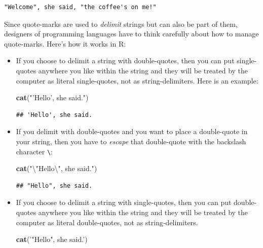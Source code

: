 \documentclass[]{book}
\makeatletter
\newenvironment{Shaded}{\begin{snugshade}}{\end{snugshade}}
\newcommand{\KeywordTok}[1]{\textcolor[rgb]{0.13,0.29,0.53}{\textbf{{#1}}}}
\newcommand{\CharTok}[1]{\textcolor[rgb]{0.31,0.60,0.02}{{#1}}}
\newcommand{\StringTok}[1]{\textcolor[rgb]{0.31,0.60,0.02}{{#1}}}
\newcommand{\NormalTok}[1]{{#1}}
\newenvironment{kframe}{%
\medskip{}
\setlength{\fboxsep}{.8em}
 \def\at@end@of@kframe{}%
 \ifinner\ifhmode%
  \def\at@end@of@kframe{\end{minipage}}%
  \begin{minipage}{\columnwidth}%
 \fi\fi%
 \def\FrameCommand##1{\hskip\@totalleftmargin \hskip-\fboxsep
 \colorbox{shadecolor}{##1}\hskip-\fboxsep
     \hskip-\linewidth \hskip-\@totalleftmargin \hskip\columnwidth}%
 \MakeFramed {\advance\hsize-\width
   \@totalleftmargin\z@ \linewidth\hsize
   \@setminipage}}%
 {\par\unskip\endMakeFramed%
 \at@end@of@kframe}
\renewenvironment{Shaded}{\begin{kframe}}{\end{kframe}}
\theoremstyle{definition}
\theoremstyle{definition}
\theoremstyle{remark}
\makeatother
\begin{document}
{\begin{verbatim}
"Welcome", she said, "the coffee's on me!"
\end{verbatim}

Since quote-marks are used to \emph{delimit} strings but can also be
part of them, designers of programming languages have to think carefully
about how to manage quote-marks. Here's how it works in R:

\begin{itemize}
\item
  If you choose to delimit a string with double-quotes, then you can put
  single-quotes anywhere you like within the string and they will be
  treated by the computer as literal single-quotes, not as
  string-delimiters. Here is an example:

\begin{Shaded}
\begin{Highlighting}[]
\KeywordTok{cat}\NormalTok{(}\StringTok{"'Hello', she said."}\NormalTok{)}
\end{Highlighting}
\end{Shaded}

\begin{verbatim}
## 'Hello', she said.
\end{verbatim}
\item
  If you delimit with double-quotes and you want to place a double-quote
  in your string, then you have to \emph{escape} that double-quote with
  the backslash character \texttt{\textbackslash{}}:

\begin{Shaded}
\begin{Highlighting}[]
\KeywordTok{cat}\NormalTok{(}\StringTok{"}\CharTok{\textbackslash{}"}\StringTok{Hello}\CharTok{\textbackslash{}"}\StringTok{, she said."}\NormalTok{)}
\end{Highlighting}
\end{Shaded}

\begin{verbatim}
## "Hello", she said.
\end{verbatim}
\item
  If you choose to delimit a string with single-quotes, then you can put
  double-quotes anywhere you like within the string and they will be
  treated by the computer as literal double-quotes, not as
  string-delimiters.

\begin{Shaded}
\begin{Highlighting}[]
\KeywordTok{cat}\NormalTok{(}\StringTok{'"Hello", she said.'}\NormalTok{)}
\end{Highlighting}
\end{Shaded}


\end{itemize}}
\end{document}
